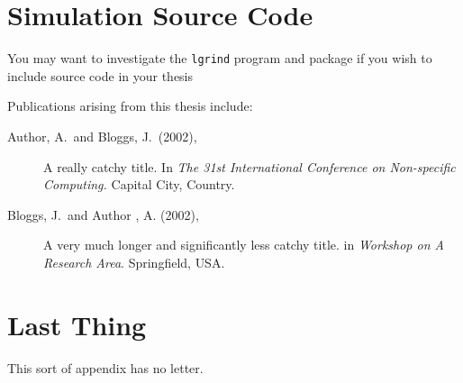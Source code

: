 \documentclass[a4paper,11pt,bcshonoursthesis,singlespace,twoside]{cssethesis}
\begin{document}
\chapter{Simulation Source Code}
You may want to investigate the \texttt{lgrind} program and package if you
wish to include source code in your thesis


\backmatter						%
\begin{thesisauthorvita}
\begin{spacing}{1}
Publications arising from this thesis include:
\begin{description}
\item[Author, A.\ and Bloggs, J.\ (2002),]
A really catchy title. In \emph{The 31st International Conference
on Non-specific Computing.} Capital City, Country.
\item[Bloggs, J.\ and Author , A. (2002),]
A very much longer and significantly less catchy title. in \emph {Workshop on
A Research Area}. Springfield, USA.
\end{description}
\end{spacing}
\end{thesisauthorvita}


\chapter{Last Thing} %
This sort of appendix has no letter. 
\end{document}
